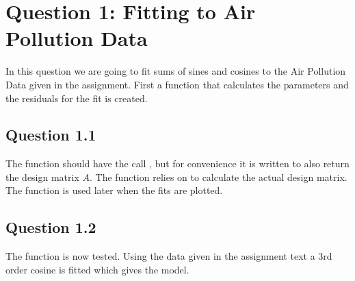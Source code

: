 \def\assignmenttitle{Assignment 2}
\def\assignmentdate{08-12-2011}
\def\assignmentnumber{2}

\def\mygamma{\frac{1}{\hat{y}}}
\def\mychi{\frac{1}{x}}





\maketitle


\section*{Question 1: Fitting to Air Pollution Data}

In this question we are going to fit sums of sines and cosines to the Air
Pollution Data given in the assignment. First a function  that
calculates the parameters and the residuals for the fit is created.

\subsection*{Question 1.1}

The function should have the call ,
but for convenience it is written to also return the design matrix $A$. The
function  relies on  to calculate the actual
design matrix. The function  is used later when the fits are
plotted.





\subsection*{Question 1.2}


The  function is now tested. Using the data given in the
assignment text a 3rd order cosine is fitted which gives the model. 

\begin{equation*}
    
\end{equation*}

